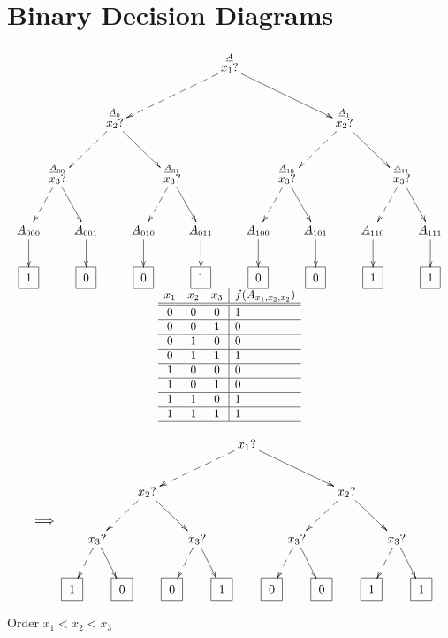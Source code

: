 \chapter{Binary Decision Diagrams}\label{ch-binarydd}

$$
\begin{array}{c}
\xymatrix@C=.1pc{
&&&&&&&\stackrel{\rvA}{x_1?}\ar@{-->}[dllll]
\ar[drrrr]
\\
&&&\stackrel{\rvA_0}{x_2?}\ar@{-->}[dll]\ar[drr]
&&&&&&&&\stackrel{\rvA_1} {x_2?}\ar@{-->}[dll]\ar[drr]
\\
&\stackrel{\rvA_{00}}{ x_3?}\ar@{-->}[dl]\ar[dr]
&&&&\stackrel{\rvA_{01}} {x_3?}\ar@{-->}[dl]\ar[dr]
&&&&\stackrel{\rvA_{10}}{ x_3?}\ar@{-->}[dl]\ar[dr]
&&&&\stackrel{\rvA_{11}}{x_3?}\ar@{-->}[dl]\ar[dr]
\\
\rvA_{000}\ar[d]
&&\rvA_{001}\ar[d]
&&\rvA_{010}\ar[d]
&&\rvA_{011}\ar[d]
&&\rvA_{100}\ar[d]
&&\rvA_{101}\ar[d]
&&\rvA_{110}\ar[d]
&&\rvA_{111}\ar[d]
\\
\Rect{1}
&&\Rect{0}
&&\Rect{0}
&&\Rect{1}
&&\Rect{0}
&&\Rect{0}
&&\Rect{1}
&&\Rect{1}
}
\\
\begin{array}{ccc|l}
x_1&x_2&x_3&f(A_{x_1,x_2,x_2})
\\ \hline\hline
0
&0
&0
&1
\\ \hline
0
&0
&1
&0
\\ \hline
0
&1
&0
&0
\\ \hline
0
&1
&1
&1
\\ \hline
1
&0
&0
&0
\\ \hline
1
&0
&1
&0
\\ \hline
1
&1
&0
&1
\\ \hline
1
&1
&1
&1
\\ \hline
\end{array}
\end{array}
$$

$$
\xymatrix{\\\\\implies}
\xymatrix@C=.1pc{
&&&&&&&x_1?\ar@{-->}[dllll]
\ar[drrrr]
\\
&&&x_2?\ar@{-->}[dll]\ar[drr]
&&&&&&&&x_2?\ar@{-->}[dll]\ar[drr]
\\
&x_3?\ar@{-->}[dl]\ar[dr]
&&&&x_3?\ar@{-->}[dl]\ar[dr]
&&&&x_3?\ar@{-->}[dl]\ar[dr]
&&&&x_3?\ar@{-->}[dl]\ar[dr]
\\
\Rect{1}
&&\Rect{0}
&&\Rect{0}
&&\Rect{1}
&&\Rect{0}
&&\Rect{0}
&&\Rect{1}
&&\Rect{1}
}
$$

Order $x_1<x_2<x_3$



